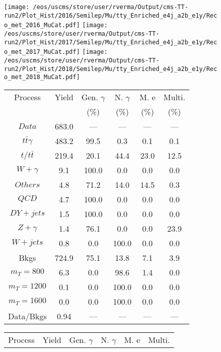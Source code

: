 \begin{figure}
\centering
\texttt{[image: /eos/uscms/store/user/rverma/Output/cms-TT-run2/Plot\_Hist/2016/Semilep/Mu/tty\_Enriched\_e4j\_a2b\_e1y/Reco\_met\_2016\_MuCat.pdf]}
\texttt{[image: /eos/uscms/store/user/rverma/Output/cms-TT-run2/Plot\_Hist/2017/Semilep/Mu/tty\_Enriched\_e4j\_a2b\_e1y/Reco\_met\_2017\_MuCat.pdf]}
\texttt{[image: /eos/uscms/store/user/rverma/Output/cms-TT-run2/Plot\_Hist/2018/Semilep/Mu/tty\_Enriched\_e4j\_a2b\_e1y/Reco\_met\_2018\_MuCat.pdf]}
\begin{minipage}[c]{0.32\textwidth}
\centering
\tiny{
\begin{tabular}{cccccc}
\hline
Process & Yield & Gen. $\gamma$ & N. $\gamma$ & M. e & Multi. \\
 &  & (\%) & (\%) & (\%) & (\%)  \\
\hline
                                                                      $ Data $ &  683.0 &  --- &  --- &  --- &  ---\\
$ t\bar{t}\gamma $ &  483.2 &  99.5 &  0.3 &  0.1 &  0.1\\
$ t/t\bar{t} $ &  219.4 &  20.1 &  44.4 &  23.0 &  12.5\\
$ W+\gamma $ &  9.1 &  100.0 &  0.0 &  0.0 &  0.0\\
$ Others $ &  4.8 &  71.2 &  14.0 &  14.5 &  0.3\\
$ QCD $ &  4.7 &  100.0 &  0.0 &  0.0 &  0.0\\
$ DY+jets $ &  1.5 &  100.0 &  0.0 &  0.0 &  0.0\\
$ Z+\gamma $ &  1.4 &  76.1 &  0.0 &  0.0 &  23.9\\
$ W+jets $ &  0.8 &  0.0 &  100.0 &  0.0 &  0.0\\
Bkgs &  724.9 &  75.1 &  13.8 &  7.1 &  3.9\\
$ m_{T} = 800 $ &  6.3 &  0.0 &  98.6 &  1.4 &  0.0\\
$ m_{T} = 1200 $ &  0.1 &  0.0 &  100.0 &  0.0 &  0.0\\
$ m_{T} = 1600 $ &  0.0 &  0.0 &  100.0 &  0.0 &  0.0\\
Data/Bkgs &  0.94 &  --- &  --- &  --- &  ---\\
\hline
\end{tabular}
}
\end{minipage}
\begin{minipage}[c]{0.32\textwidth}
\centering
\tiny{
\begin{tabular}{cccccc}
\hline
Process & Yield & Gen. $\gamma$ & N. $\gamma$ & M. e & Multi. \\

\end{tabular}}
\end{minipage}
\end{figure}
